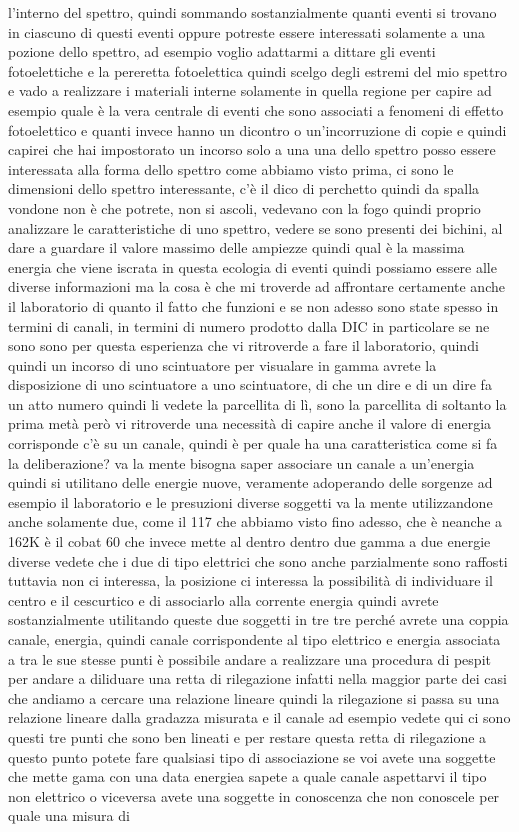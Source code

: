l'interno del spettro, quindi sommando sostanzialmente quanti eventi si trovano in ciascuno di questi eventi oppure potreste essere interessati solamente a una pozione dello spettro, ad esempio voglio adattarmi a dittare gli eventi fotoelettiche e la pereretta fotoelettica quindi scelgo degli estremi del mio spettro e vado a realizzare i materiali interne solamente in quella regione per capire ad esempio quale è la vera centrale di eventi che sono associati a fenomeni di effetto fotoelettico e quanti invece hanno un dicontro o un'incorruzione di copie e quindi capirei che hai impostorato un incorso solo a una una dello spettro posso essere interessata alla forma dello spettro come abbiamo visto prima, ci sono le dimensioni dello spettro interessante, c'è il dico di perchetto quindi da spalla vondone non è che potrete, non si ascoli, vedevano con la fogo quindi proprio analizzare le caratteristiche di uno spettro, vedere se sono presenti dei bichini, al dare a guardare il valore massimo delle ampiezze quindi qual è la massima energia che viene iscrata in questa ecologia di eventi quindi possiamo essere alle diverse informazioni ma la cosa è che mi troverde ad affrontare certamente anche il laboratorio di quanto il fatto che funzioni e se non adesso sono state spesso in termini di canali, in termini di numero prodotto dalla DIC in particolare se ne sono sono per questa esperienza che vi ritroverde a fare il laboratorio, quindi quindi un incorso di uno scintuatore per visualare in gamma avrete la disposizione di uno scintuatore a uno scintuatore, di che un dire e di un dire fa un atto numero quindi li vedete la parcellita di lì, sono la parcellita di soltanto la prima metà però vi ritroverde una necessità di capire anche il valore di energia corrisponde c'è su un canale, quindi è per quale ha una caratteristica come si fa la deliberazione? va la mente bisogna saper associare un canale a un'energia quindi si utilitano delle energie nuove, veramente adoperando delle sorgenze ad esempio il laboratorio e le presuzioni diverse soggetti va la mente utilizzandone anche solamente due, come il 117 che abbiamo visto fino adesso, che è neanche a 162K è il cobat 60 che invece mette al dentro dentro due gamma a due energie diverse vedete che i due di tipo elettrici che sono anche parzialmente sono raffosti tuttavia non ci interessa, la posizione ci interessa la possibilità di individuare il centro e il cescurtico e di associarlo alla corrente energia quindi avrete sostanzialmente utilitando queste due soggetti in tre tre perché avrete una coppia canale, energia, quindi canale corrispondente al tipo elettrico e energia associata a tra le sue stesse punti è possibile andare a realizzare una procedura di pespit per andare a diliduare una retta di rilegazione infatti nella maggior parte dei casi che andiamo a cercare una relazione lineare quindi la rilegazione si passa su una relazione lineare dalla gradazza misurata e il canale ad esempio vedete qui ci sono questi tre punti che sono ben lineati e per restare questa retta di rilegazione a questo punto potete fare qualsiasi tipo di associazione se voi avete una soggette che mette gama con una data energiea sapete a quale canale aspettarvi il tipo non elettrico o viceversa avete una soggette in conoscenza che non conoscele per quale una misura di 